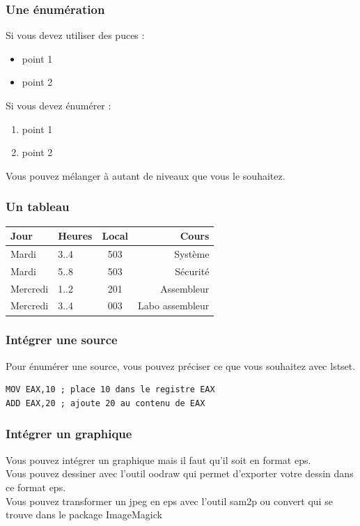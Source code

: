 \subsubsection {Une énumération}
Si vous devez utiliser des puces :
\begin{itemize}
\item point 1
\item point 2
\end{itemize}
Si vous devez énumérer :
\begin{enumerate}
\item point 1
\item point 2
\end{enumerate}
Vous pouvez mélanger à autant de niveaux que vous le souhaitez.
\subsubsection{Un tableau}
\begin{tabular}{|l|l||c||r|} %
\hline
Jour & Heures & Local & Cours \\
\hline
Mardi    &  3..4  & 503 & Système\\
Mardi    &  5..8  & 503 & Sécurité\\
\hline
Mercredi  &  1..2  &  201 & Assembleur\\
Mercredi  &  3..4  &  003 & Labo assembleur\\
\hline
\end{tabular}
\subsubsection {Intégrer une source}
Pour énumérer une source, vous pouvez préciser ce que vous souhaitez avec lstset. 
\begin{lstlisting}
MOV EAX,10 ; place 10 dans le registre EAX
ADD EAX,20 ; ajoute 20 au contenu de EAX
\end{lstlisting}
\subsubsection {Intégrer un graphique}
Vous pouvez intégrer un graphique mais il faut qu'il soit en format eps.\\
Vous pouvez dessiner avec l'outil oodraw qui permet d'exporter votre dessin dans ce format eps.\\
Vous pouvez transformer un jpeg en eps avec l'outil sam2p ou convert qui se trouve dans le package ImageMagick\\
